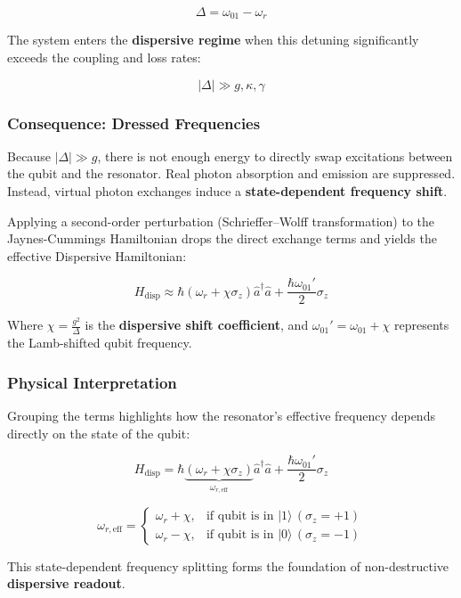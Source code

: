 \documentclass[
]{article}
\begin{document}
\[\Delta = \omega_{01} - \omega_r\]

The system enters the \textbf{dispersive regime} when this detuning
significantly exceeds the coupling and loss rates:

\[|\Delta| \gg g, \kappa, \gamma\]

\subsubsection{Consequence: Dressed
Frequencies}\label{consequence-dressed-frequencies}

Because \(|\Delta| \gg g\), there is not enough energy to directly swap
excitations between the qubit and the resonator. Real photon absorption
and emission are suppressed. Instead, virtual photon exchanges induce a
\textbf{state-dependent frequency shift}.

Applying a second-order perturbation (Schrieffer--Wolff transformation)
to the Jaynes-Cummings Hamiltonian drops the direct exchange terms and
yields the effective Dispersive Hamiltonian:

\[H_{\text{disp}} \approx \hbar \left( \omega_r + \chi \sigma_z \right) \hat{a}^\dagger \hat{a} + \frac{\hbar \omega_{01}'}{2} \sigma_z\]

Where \(\chi = \frac{g^2}{\Delta}\) is the \textbf{dispersive shift
coefficient}, and \(\omega_{01}' = \omega_{01} + \chi\) represents the
Lamb-shifted qubit frequency.

\subsubsection{Physical Interpretation}\label{physical-interpretation}

Grouping the terms highlights how the resonator's effective frequency
depends directly on the state of the qubit:

\[H_{\text{disp}} = \hbar \underbrace{\left( \omega_r + \chi \sigma_z \right)}_{\omega_{r,\text{eff}}} \hat{a}^\dagger \hat{a} + \frac{\hbar \omega_{01}'}{2} \sigma_z\]

\[\omega_{r,\text{eff}} = \begin{cases} \omega_r + \chi, & \text{if qubit is in } |1\rangle \, (\sigma_z = +1) \\ \omega_r - \chi, & \text{if qubit is in } |0\rangle \, (\sigma_z = -1) \end{cases}\]

This state-dependent frequency splitting forms the foundation of
non-destructive \textbf{dispersive readout}.
\end{document}
